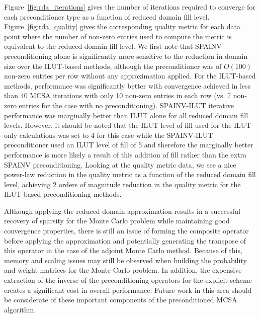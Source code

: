 Figure~\ref{fig:rda_iterations} gives the number of iterations
required to converge for each preconditioner type as a function of
reduced domain fill level. Figure~\ref{fig:rda_quality} gives the
corresponding quality metric for each data point where the number of
non-zero entries used to compute the metric is equivalent to the
reduced domain fill level. We first note that SPAINV preconditioning
alone is significantly more sensitive to the reduction in domain size
over the ILUT-based methods, although the preconditioner was of
$O(100)$ non-zero entries per row without any approximation
applied. For the ILUT-based methods, performance was significantly
better with convergence achieved in less than 40 MCSA iterations with
only 10 non-zero entries in each row (vs. 7 non-zero entries for the
case with no preconditioning). SPAINV-ILUT iterative performance was
marginally better than ILUT alone for all reduced domain fill
levels. However, it should be noted that the ILUT level of fill used
for the ILUT only calculations was set to 4 for this case while the
SPAINV-ILUT preconditioner used an ILUT level of fill of 5 and
therefore the marginally better performance is more likely a result of
this addition of fill rather than the extra SPAINV
preconditioning. Looking at the quality metric data, we see a nice
power-law reduction in the quality metric as a function of the reduced
domain fill level, achieving 2 orders of magnitude reduction in the
quality metric for the ILUT-based preconditioning methods.

Although applying the reduced domain approximation results in a
successful recovery of sparsity for the Monte Carlo problem while
maintaining good convergence properties, there is still an issue of
forming the composite operator before applying the approximation and
potentially generating the transpose of this operator in the case of
the adjoint Monte Carlo method. Because of this, memory and scaling
issues may still be observed when building the probability and weight
matrices for the Monte Carlo problem. In addition, the expensive
extraction of the inverse of the preconditioning operators for the
explicit scheme creates a significant cost in overall
performance. Future work in this area should be considerate of these
important components of the preconditioned MCSA algorithm.


